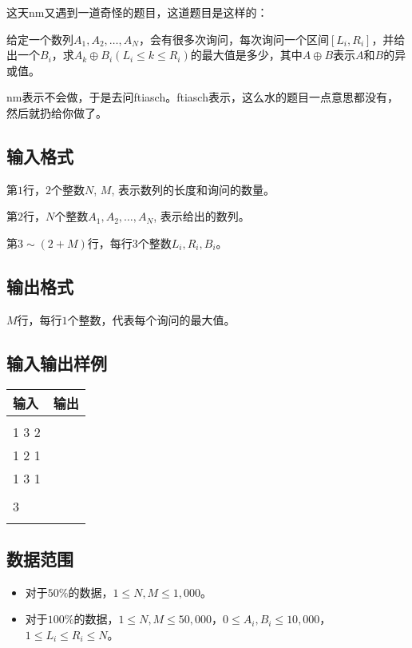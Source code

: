 \documentclass[a4paper]{article}
\newcommand{\inputformat}{\subsection{输入格式}}
\newcommand{\outputformat}{\subsection{输出格式}}
\newcommand{\sample}[2]{
\subsection{输入输出样例}
\begin{tabular}{|l|l|}
    \hline
    输入 & 输出 \\
    \hline
    \begin{minipage}[t]{200pt}
        \begin{ttfamily} #1 \end{ttfamily}
    \end{minipage} &
    \begin{minipage}[t]{200pt}
        \begin{ttfamily} #2 \end{ttfamily}
    \end{minipage} \\
    \hline
\end{tabular}
\vspace{1ex}
\par
}
\newcommand{\dataset}{\subsection{数据范围}}
\begin{document}
这天nm又遇到一道奇怪的题目，这道题目是这样的：

给定一个数列$A_1, A_2, \ldots, A_N$，会有很多次询问，每次询问一个区间$[L_i, R_i]$，并给出一个$B_i$，求$A_k \oplus B_i(L_i \leq k \leq R_i)$的最大值是多少，其中$A \oplus B$表示$A$和$B$的异或值。

nm表示不会做，于是去问ftiasch。ftiasch表示，这么水的题目一点意思都没有，然后就扔给你做了。

\inputformat{}

第$1$行，$2$个整数$N$, $M$, 表示数列的长度和询问的数量。

第$2$行，$N$个整数$A_1, A_2, \ldots, A_N$, 表示给出的数列。

第$3 \sim (2 + M)$行，每行$3$个整数$L_i, R_i, B_i$。

\outputformat{}

$M$行，每行$1$个整数，代表每个询问的最大值。

\sample{
3 2 \\
1 3 2 \\
1 2 1 \\
1 3 1 \\
}{
2 \\
3 \\
}

\dataset

\begin{itemize}
    \item 对于$50\%$的数据，$1 \leq N, M \leq 1,000$。

    \item 对于$100\%$的数据，$1 \leq N, M \leq 50,000$，$0 \leq A_i, B_i \leq 10,000$，$1 \leq L_i \leq R_i \leq N$。
\end{itemize}
\end{document}
